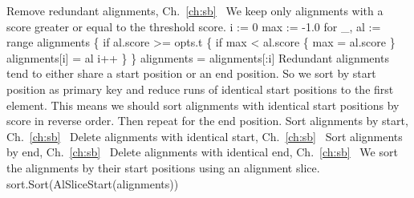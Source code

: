 \LA{}Remove redundant alignments, Ch.~\ref{ch:sb}~{\nwtagstyle{}}\RA{}
\nwendcode{}\nwdocspar
We keep only alignments with a score greater or equal to the threshold
score.
\nwenddocs{}\endmoddef\nwstartdeflinemarkup{}\nwenddeflinemarkup
i := 0
max := -1.0
for _, al := range alignments \{
          if al.score >= opts.t \{
                  if max < al.score \{ max = al.score \}
                  alignments[i] = al
                  i++
          \}
\}
alignments = alignments[:i]
\nwendcode{}\nwdocspar
Redundant alignments tend to either share a start position or an end
position. So we sort by start position as primary key and reduce runs
of identical start positions to the first element. This means we
should sort alignments with identical start positions by score in
reverse order.  Then repeat for the end position.
\nwenddocs{}\endmoddef\nwstartdeflinemarkup{}\nwenddeflinemarkup
\LA{}Sort alignments by start, Ch.~\ref{ch:sb}~{\nwtagstyle{}}\RA{}
\LA{}Delete alignments with identical start, Ch.~\ref{ch:sb}~{\nwtagstyle{}}\RA{}
\LA{}Sort alignments by end, Ch.~\ref{ch:sb}~{\nwtagstyle{}}\RA{}
\LA{}Delete alignments with identical end, Ch.~\ref{ch:sb}~{\nwtagstyle{}}\RA{}
\nwendcode{}\nwdocspar
We sort the alignments by their start positions using an alignment
slice.
\nwenddocs{}\endmoddef\nwstartdeflinemarkup{}\nwenddeflinemarkup
sort.Sort(AlSliceStart(alignments))
\nwendcode{}\nwdocspar
